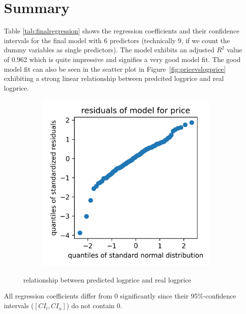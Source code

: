\documentclass[12 pt]{scrartcl}
\begin{document}
\section{Summary}

Table \ref{tab:finalregression} shows the regression coefficients and their confidence intervals for the final model with 6 predictors (technically 9, if we count the dummy variables as single predictors). The model exhibits an adjusted $R^2$ value of 0.962 which is quite impressive and signifies a very good model fit. The good model fit can also be seen in the scatter plot in Figure~\ref{fig:pricevslogprice} exhibiting a strong linear relationship between predcited logprice and real logprice.



\begin{figure}[htb]
  \centering

  \begin{subfigure}[b]{0.32\textwidth}
    \centering
    \includegraphics[width=\textwidth]{./images/qqplot_resz_price.png}
    \label{fig:predandreallogprice}
  \end{subfigure}
  \caption{relationship between predicted logprice and real logprice}
  \label{fig:modelfit}
\end{figure}


All regression coefficients differ from 0 significantly since their 95\%-confidence intervals ($[CI_l, CI_u]$) do not contain 0.
\end{document}
